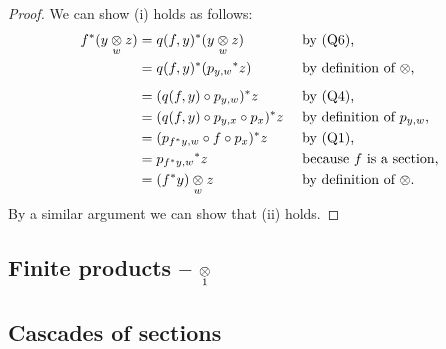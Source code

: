 \begin{proof}
We can show (i) holds as follows: 
\begin{align*}
f^*(\yz) &= q(f,y)^*(\yz)                           &&\mbox{ by (Q6),}                \\
          &= q(f,y)^*({p_{y,w}} ^* z)               &&\mbox{ by definition of $\crossx{}{}{}$,}              \\
          &= (q(f,y)\circ p_{y,w}) ^* z             &&\mbox{ by (Q4),}                         \\
          &= (q(f,y) \circ p_{y,x} \circ p_x ) ^* z &&\mbox{ by definition of $p_{y,w}$,}      \\
          &= (p_{f^*y,w} \circ f \circ p_x ) ^* z   &&\mbox{ by (Q1),} \\
          &= {p_{f^*y,w}}^*z                        &&\mbox{ because $f$ is a section,}                   \\
          &= \crossx{(f^*y)}{z}{w}                  &&\mbox{ by definition of $\crossx{}{}{}$.}
\end{align*}
By a similar argument we can show that (ii) holds. 
\end{proof}



\subsection{Finite products -- $\crossx{}{}{1}$}


\subsection{Cascades of sections}
